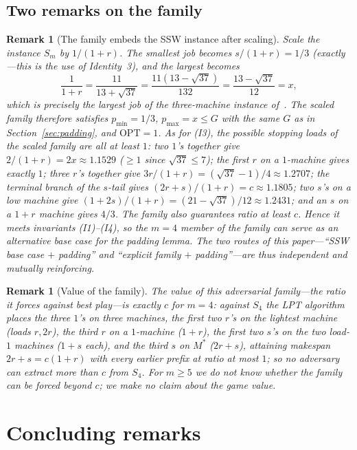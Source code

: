 \documentclass[11pt]{article}
\newtheorem{remark}[theorem]{Remark}
\theoremstyle{definition}
\newcommand{\opt}{\mathrm{OPT}}
\begin{document}
\subsection{Two remarks on the family}

\begin{remark}[The family embeds the SSW instance after scaling]
\label{rem:embed}
Scale the instance $S_{m}$ by $1/(1+r)$. The smallest job becomes
$s/(1+r)=1/3$ (exactly---this is the use of Identity~3), and the largest
becomes
\[
\frac{1}{1+r}=\frac{11}{13+\sqrt{37}}
=\frac{11(13-\sqrt{37})}{132}
=\frac{13-\sqrt{37}}{12}=x,
\]
which is precisely the largest job of the three-machine instance
of~\cite{SSW00}. The scaled family therefore satisfies
$p_{\min}=1/3$, $p_{\max}=x\le G$ with the same $G$ as in
Section~\ref{sec:padding}, and $\opt=1$. As for \emph{(I3)}, the possible
stopping loads of the scaled family are all at least $1$: two $1$'s together
give $2/(1+r)=2x\approx1.1529$ ($\ge1$ since $\sqrt{37}\le7$); the first $r$
on a $1$-machine gives exactly $1$; three $r$'s together give
$3r/(1+r)=(\sqrt{37}-1)/4\approx1.2707$; the terminal branch of the $s$-tail
gives $(2r+s)/(1+r)=c\approx1.1805$; two $s$'s on a low machine give
$(1+2s)/(1+r)=(21-\sqrt{37})/12\approx1.2431$; and an $s$ on a $1+r$ machine
gives $4/3$. The family also guarantees ratio at least $c$. Hence it meets
invariants (I1)--(I4), so the $m=4$ member of the family can serve
as an \emph{alternative base case} for the padding lemma. The two routes
of this paper---``SSW base case $+$ padding'' and ``explicit family
$+$ padding''---are thus independent and mutually reinforcing.
\end{remark}

\begin{remark}[Value of the family]
\label{rem:value}
The value of this adversarial family---the ratio it forces against best
play---is exactly $c$ for $m=4$: against $S_{4}$ the LPT algorithm places
the three $1$'s on three machines, the first two $r$'s on the lightest
machine (loads $r,2r$), the third $r$ on a $1$-machine ($1+r$), the first
two $s$'s on the two load-$1$ machines ($1+s$ each), and the third $s$ on
$M^{*}$ ($2r+s$), attaining makespan $2r+s=c(1+r)$ with every earlier
prefix at ratio at most $1$; so no adversary can extract more than $c$ from
$S_{4}$. For $m\ge5$ we do not know whether the family can be forced
beyond $c$; we make no claim about the game value.
\end{remark}

\section{Concluding remarks}
\label{sec:conclusion}
\end{document}
